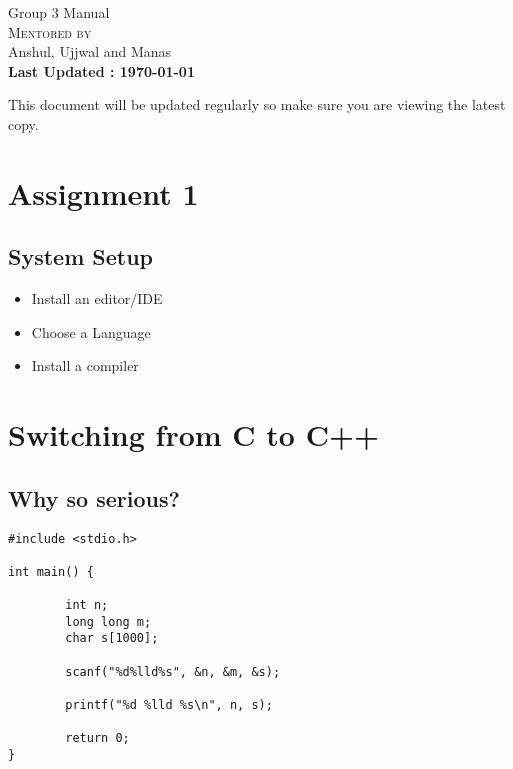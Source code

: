 \documentclass[13pt, oneside, a4paper]{book}
\begin{document}
\begin{titlepage}
\begin{center}
        \pagebreak

        \hspace{0pt}
        \vfill
        {\fontsize{32pt}{10pt}\selectfont Group 3 Manual}\\
        \vspace{3cm}
        \textsc{\Large Mentored by} \\

        {\large Anshul, Ujjwal and Manas} \\
        \vspace{1cm}
        \textbf{Last Updated : \today}

        \vspace*{\fill}
\end{center}

        {\fontsize{11pt}{10pt}\selectfont
               This document will be updated regularly so make sure you are viewing the latest copy. 
        }
\end{titlepage}

\tableofcontents
\clearpage
{}

\chapter{Assignment 1}
\section{System Setup}
\begin{itemize}
        \item Install an editor/IDE
        \item Choose a Language
        \item Install a compiler
\end{itemize}

\clearpage

\chapter{Switching from C to C++}
\section{Why so serious?}

\begin{verbatim}
#include <stdio.h>

int main() {

        int n;
        long long m;
        char s[1000];

        scanf("%d%lld%s", &n, &m, &s);

        printf("%d %lld %s\n", n, s);

        return 0;
}
\end{verbatim}
\end{document}
